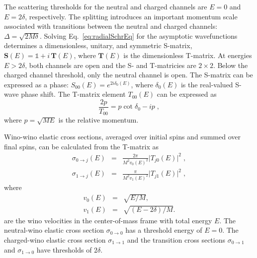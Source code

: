 \documentclass[%
 reprint,
 amsmath,amssymb,
 aps,
]{revtex4-1}
\begin{document}
The scattering thresholds for the neutral and charged channels are $E=0$ and $E= 2\delta$, respectively.
The splitting introduces an important momentum scale associated with transitions between the neutral and charged channels: $\Delta = \sqrt{2M\delta}$.
Solving Eq.~\eqref{eq:radialSchrEq} for the asymptotic wavefunctions determines a dimensionless, unitary, and symmetric S-matrix, $\bm{S}(E) = \mathds{1} + i \, \bm{T}(E)$, where $\bm{T}(E)$ is the dimensionless T-matrix.
At energies $E>2\delta$, both channels are open and the S- and T-matricies are $2 \times 2$. Below the charged channel threshold, only the neutral channel is open.
The S-matrix can be expressed as a phase: $S_{00}(E) = e^{2i\delta_0(E)}$, where $\delta_0(E)$ is the real-valued S-wave phase shift. The T-matrix element $T_{00}(E)$ can be expressed as
\begin{equation}
\frac{2p}{T_{00}} = p \cot\delta_0 -ip \;,
\label{eq:T00pcotdelta}
\end{equation}
where $p=\sqrt{ME}$ is the relative momentum.

Wino-wino elastic cross sections, averaged over initial spins and summed over final spins, can be calculated from the T-matrix as
\begin{subequations}
\begin{eqnarray}
\sigma_{0 \to j}(E) &=& \frac{2\pi}{M^2 v_0(E)^2} \big| T_{j0}(E) \big|^2 \;,
\label{eq:sig0j-T}
\\
\sigma_{1\to j}(E) &=&   \frac{\pi}{M^2 v_1(E)^2}\big| T_{j1}(E) \big|^2 \;,
\label{eq:sig1j-T}
\end{eqnarray}
\label{eq:sigij-T}%
\end{subequations}
where
\begin{subequations}
\begin{eqnarray}
v_0(E) &=&  \sqrt{E/M},
\label{eq:v0-E}
 \\
v_1(E) &=&  \sqrt{(E-2 \delta)/M}.
\label{eq:v1-E}
\end{eqnarray}%
\label{eq:v0,1-E}%
\end{subequations}%
are the wino velocities in the center-of-mass frame with total energy $E$.
The neutral-wino elastic cross section $\sigma_{0 \to 0}$ has a threshold energy of $E=0$.
The charged-wino elastic cross section $\sigma_{1 \to 1}$ and the transition cross sections $\sigma_{0 \to 1}$ and $\sigma_{1 \to 0}$ have thresholds of $2\delta$.
\end{document}
